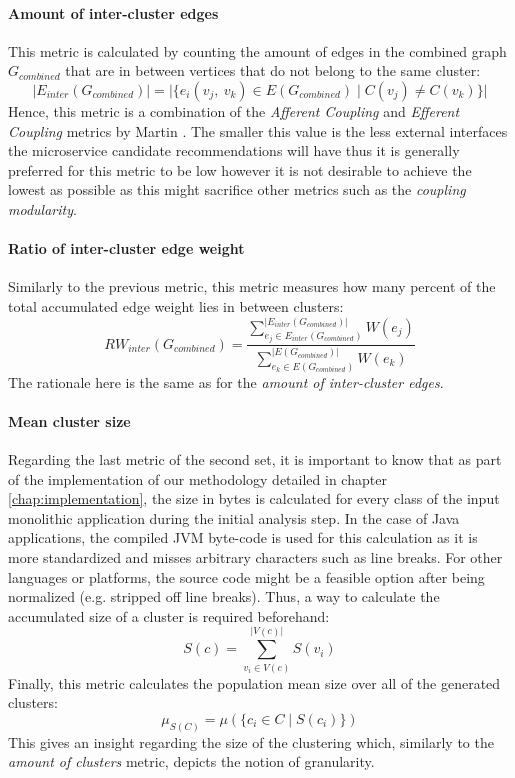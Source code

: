 \documentclass[12pt,a4paper]{report}
\begin{document}
\paragraph{Amount of inter-cluster edges}
This metric is calculated by counting the amount of edges in the combined graph
\(G_{combined}\) that are in between vertices that do not belong to the same cluster:
\[
  \vert E_{inter}(G_{combined}) \vert =
  \vert \{ e_i(v_j, \ v_k) \in E(G_{combined}) \mid C(v_j) \neq C(v_k) \} \vert
\]
Hence, this metric is a combination of the \textit{Afferent Coupling} and
\textit{Efferent Coupling} metrics by Martin \cite{martin2000design}.
The smaller this value is the less external interfaces the microservice candidate
recommendations will have thus it is generally preferred for this metric to be
low however it is not desirable to achieve the lowest as possible as this
might sacrifice other metrics such as the \textit{coupling modularity}.

\paragraph{Ratio of inter-cluster edge weight}
Similarly to the previous metric, this metric measures how many percent
of the total accumulated edge weight lies in between clusters:
\[
  RW_{inter}(G_{combined}) =
  \frac{
    \sum_{e_j \in E_{inter}(G_{combined})}^{\vert E_{inter}(G_{combined}) \vert} W(e_j)
  }{
    \sum_{e_k \in E(G_{combined})}^{\vert E(G_{combined}) \vert} W(e_k)
  }
\]
The rationale here is the same as for the \textit{amount of inter-cluster edges}.

\paragraph{Mean cluster size}
Regarding the last metric of the second set, it is important to know that
as part of the implementation of our methodology detailed in chapter
\ref{chap:implementation}, the size in bytes is calculated for every class
of the input monolithic application during the initial analysis step.
In the case of Java applications, the compiled JVM byte-code is used for this
calculation as it is more standardized and misses arbitrary characters such as
line breaks. For other languages or platforms, the source code might be a
feasible option after being normalized (e.g. stripped off line breaks).
Thus, a way to calculate the accumulated size of a cluster is required beforehand:
\[
  S(c) = \sum_{v_i \in V(c)}^{\vert V(c) \vert} S(v_i)
\]
Finally, this metric calculates the population mean size over all of the
generated clusters:
\[
  \mu_{S(C)} = \mu(\{ c_i \in C \mid S(c_i) \})
\]
This gives an insight regarding the size of the clustering which, similarly to
the \textit{amount of clusters} metric, depicts the notion of granularity.
\end{document}
